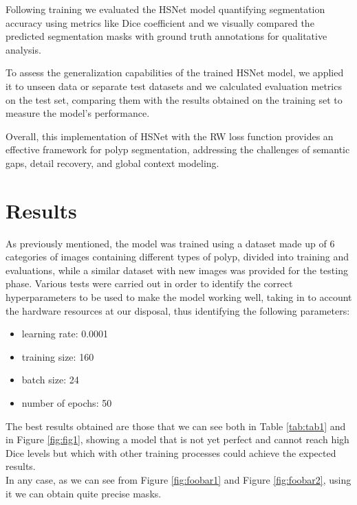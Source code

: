 \documentclass[
	a4paper, %
	10pt, %
	unnumberedsections, %
	twoside, %
]{LTJournalArticle}
\begin{document}
Following training we evaluated the HSNet model quantifying segmentation accuracy using metrics like Dice coefficient and we visually compared the predicted segmentation masks with ground truth annotations for qualitative analysis.

To assess the generalization capabilities of the trained HSNet model, we applied it to unseen data or separate test datasets and we calculated evaluation metrics on the test set, comparing them with the results obtained on the training set to measure the model's performance.

Overall, this implementation of HSNet with the RW loss function provides an effective framework for polyp segmentation, addressing the challenges of semantic gaps, detail recovery, and global context modeling.



\section{Results}

As previously mentioned, the model was trained using a dataset made up of 6 categories of images containing different types of polyp, divided into training and evaluations, while a similar dataset with new images was provided for the testing phase.
Various tests were carried out in order to identify the correct hyperparameters to be used to make the model working well, taking in to account the hardware resources at our disposal, thus identifying the following parameters:
\begin{itemize}
	\item learning rate: 0.0001 
    \item training size: 160
    \item batch size: 24
    \item number of epochs: 50
\end{itemize}

The best results obtained are those that we can see both in Table \ref{tab:tab1} and in Figure \ref{fig:fig1}, showing a model that is not yet perfect and cannot reach high Dice levels but which with other training processes could achieve the expected results.\\
In any case, as we can see from Figure \ref{fig:foobar1} and Figure \ref{fig:foobar2}, using it we can obtain quite precise masks.
\end{document}
